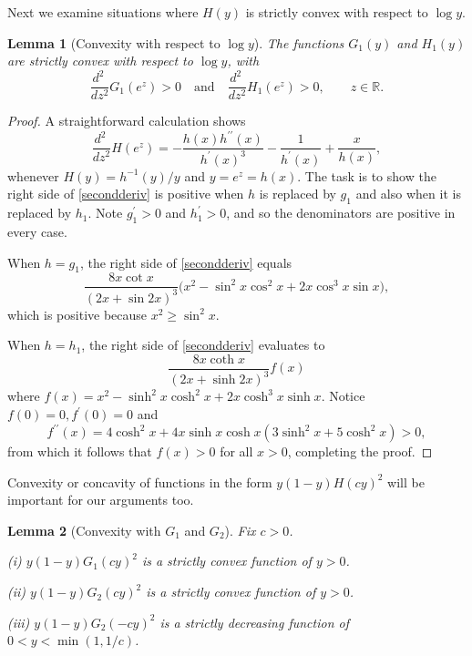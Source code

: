 \documentclass[12pt,reqno]{amsart}
\newtheorem{lemma}[lemma]{Lemma}
\theoremstyle{definition}
\newcommand{\h}{H}
\newcommand{\go}{G_1}
\newcommand{\gt}{G_2}
\newcommand{\ho}{H_1}
\newcommand{\R}{{\mathbb R}}
\begin{document}
Next we examine situations where $\h(y)$ is strictly convex with respect to $\log y$. 
%
\begin{lemma}[Convexity with respect to $\log y$]\label{convexity}
The functions $\go(y)$ and $\ho(y)$ are strictly convex with respect to $\log y$, with 
\[
\frac{d^2\ }{dz^2} \go(e^z) > 0 \quad \text{and} \quad \frac{d^2\ }{dz^2} \ho(e^z) > 0 , \qquad z \in \R .
\]
\end{lemma}
%
\begin{proof}
A straightforward calculation shows 
%
\begin{equation}\label{secondderiv}
\frac{d^2\ }{dz^2} \h(e^z) = - \frac{h(x) h^{\prime \prime}(x)}{h^\prime(x)^3} - \frac{1}{h^\prime(x)} + \frac{x}{h(x)} ,
\end{equation}
%
whenever $H(y)=h^{-1}(y)/y$ and $y=e^z=h(x)$. The task is to show the right side of \eqref{secondderiv} is positive when $h$ is replaced by $g_1$ and also when it is replaced by $h_1$. Note $g_1^\prime>0$ and $h_1^\prime>0$, and so the denominators are positive in every case. 

When $h=g_1$, the right side of \eqref{secondderiv} equals
\[
\frac{8x \cot x}{(2x+\sin 2x)^3} \big(x^2-\sin^2 x \cos^2 x +2x \cos^3 x \sin x \big) ,
\]
which is positive because $x^2 \geq \sin^2 x$.

When $h=h_1$, the right side of \eqref{secondderiv} evaluates to 
\[
\frac{8x \coth x}{(2x+\sinh 2x)^3} f(x) 
\]
where $f(x)=x^2-\sinh^2 x \cosh^2 x + 2x \cosh^3 x \sinh x$. Notice $f(0)=0,f^\prime(0)=0$ and 
\[
f^{\prime \prime}(x) = 4 \cosh^2 x + 4 x \sinh x \cosh x (3\sinh^2 x + 5\cosh^2 x ) > 0 ,
\]
from which it follows that $f(x)>0$ for all $x>0$, completing the proof. 
\end{proof}
%
Convexity or concavity of functions in the form $y(1-y)\h(cy)^2$ will be important for our arguments too. 
%
\begin{lemma}[Convexity with $\go$ and $\gt$]\label{convexityyy} Fix $c>0$. 

(i) $y(1-y)\go(cy)^2$ is a strictly convex function of $y>0$. 

(ii) $y(1-y)\gt(cy)^2$ is a strictly convex function of $y>0$. 

(iii) $y(1-y)\gt(-cy)^2$ is a strictly decreasing function of $0<y<\min(1,1/c)$. 
\end{lemma}
%
\end{document}
